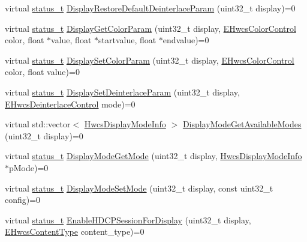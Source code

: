 \begin{DoxyCompactItemize}
virtual \mbox{\hyperlink{hwcserviceapi_8h_a3806fb2027d9a316d8ca8d9b8b8eb96f}{status\+\_\+t}} \mbox{\hyperlink{classhwcomposer_1_1IControls_aeb24361552467205e292bfe7a733760e}{Display\+Restore\+Default\+Deinterlace\+Param}} (uint32\+\_\+t display)=0
\item 
virtual \mbox{\hyperlink{hwcserviceapi_8h_a3806fb2027d9a316d8ca8d9b8b8eb96f}{status\+\_\+t}} \mbox{\hyperlink{classhwcomposer_1_1IControls_a2cf04dc4db1f9e1501dbd381fd390206}{Display\+Get\+Color\+Param}} (uint32\+\_\+t display, \mbox{\hyperlink{hwcserviceapi_8h_a1d1cbf448ce748672cf3dd96675d70e4}{E\+Hwcs\+Color\+Control}} color, float $\ast$value, float $\ast$startvalue, float $\ast$endvalue)=0
\item 
virtual \mbox{\hyperlink{hwcserviceapi_8h_a3806fb2027d9a316d8ca8d9b8b8eb96f}{status\+\_\+t}} \mbox{\hyperlink{classhwcomposer_1_1IControls_a85a46964e57700804a3e6f6289f8046f}{Display\+Set\+Color\+Param}} (uint32\+\_\+t display, \mbox{\hyperlink{hwcserviceapi_8h_a1d1cbf448ce748672cf3dd96675d70e4}{E\+Hwcs\+Color\+Control}} color, float value)=0
\item 
virtual \mbox{\hyperlink{hwcserviceapi_8h_a3806fb2027d9a316d8ca8d9b8b8eb96f}{status\+\_\+t}} \mbox{\hyperlink{classhwcomposer_1_1IControls_ac1e0de62aefa375f4f6dfd565046ba1d}{Display\+Set\+Deinterlace\+Param}} (uint32\+\_\+t display, \mbox{\hyperlink{hwcserviceapi_8h_a8473f2ec9e7333e67be46a1bea689113}{E\+Hwcs\+Deinterlace\+Control}} mode)=0
\item 
virtual std\+::vector$<$ \mbox{\hyperlink{hwcserviceapi_8h_a6e13f5285374b86aab82ec0c0ba62d7a}{Hwcs\+Display\+Mode\+Info}} $>$ \mbox{\hyperlink{classhwcomposer_1_1IControls_a89180fa507885f5d7ed1d02595f2be49}{Display\+Mode\+Get\+Available\+Modes}} (uint32\+\_\+t display)=0
\item 
virtual \mbox{\hyperlink{hwcserviceapi_8h_a3806fb2027d9a316d8ca8d9b8b8eb96f}{status\+\_\+t}} \mbox{\hyperlink{classhwcomposer_1_1IControls_aa26011465d8f977f12a4ba19a646f917}{Display\+Mode\+Get\+Mode}} (uint32\+\_\+t display, \mbox{\hyperlink{hwcserviceapi_8h_a6e13f5285374b86aab82ec0c0ba62d7a}{Hwcs\+Display\+Mode\+Info}} $\ast$p\+Mode)=0
\item 
virtual \mbox{\hyperlink{hwcserviceapi_8h_a3806fb2027d9a316d8ca8d9b8b8eb96f}{status\+\_\+t}} \mbox{\hyperlink{classhwcomposer_1_1IControls_a276c0ad9ee6973cab285da547f929e3f}{Display\+Mode\+Set\+Mode}} (uint32\+\_\+t display, const uint32\+\_\+t config)=0
\item 
virtual \mbox{\hyperlink{hwcserviceapi_8h_a3806fb2027d9a316d8ca8d9b8b8eb96f}{status\+\_\+t}} \mbox{\hyperlink{classhwcomposer_1_1IControls_a99550456802b4989806ac630f65db636}{Enable\+H\+D\+C\+P\+Session\+For\+Display}} (uint32\+\_\+t display, \mbox{\hyperlink{hwcserviceapi_8h_a69e9b3a54e4c8e504845398c66eab655}{E\+Hwcs\+Content\+Type}} content\+\_\+type)=0

\end{DoxyCompactItemize}
